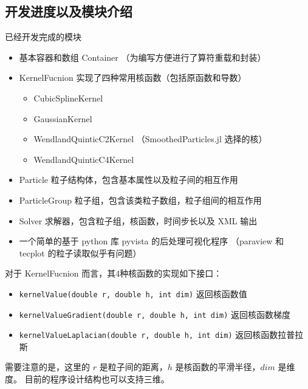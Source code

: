 \subsection{开发进度以及模块介绍}

\begin{frame}
    \begin{block}{已经开发完成的模块}
        \begin{itemize}
            \item 基本容器和数组 Container （为编写方便进行了算符重载和封装）
            \item KernelFucnion 实现了四种常用核函数（包括原函数和导数）
            \begin{itemize}
                \item CubicSplineKernel
                \item GaussianKernel
                \item WendlandQuinticC2Kernel （SmoothedParticles.jl 选择的核）
                \item WendlandQuinticC4Kernel
            \end{itemize}
            \item Particle 粒子结构体，包含基本属性以及粒子间的相互作用
            \item ParticleGroup 粒子组，包含该类粒子数组，粒子组间的相互作用
            \item Solver 求解器，包含粒子组，核函数，时间步长以及 XML 输出
            \item 一个简单的基于 python 库 pyvista 的后处理可视化程序 
            （paraview 和 tecplot 的粒子读取似乎有问题）
        \end{itemize}
    \end{block}
\end{frame}

\begin{frame}
    对于 KernelFucnion 而言，其4种核函数的实现如下接口：
    \begin{itemize}
        \item \texttt{kernelValue(double r, double h, int dim)} 返回核函数值
        \item \texttt{kernelValueGradient(double r, double h, int dim)} 返回核函数梯度
        \item \texttt{kernelValueLaplacian(double r, double h, int dim)} 返回核函数拉普拉斯
    \end{itemize}

    需要注意的是，这里的 $r$ 是粒子间的距离，$h$ 是核函数的平滑半径，$dim$ 是维度。
    目前的程序设计结构也可以支持三维。
\end{frame}

